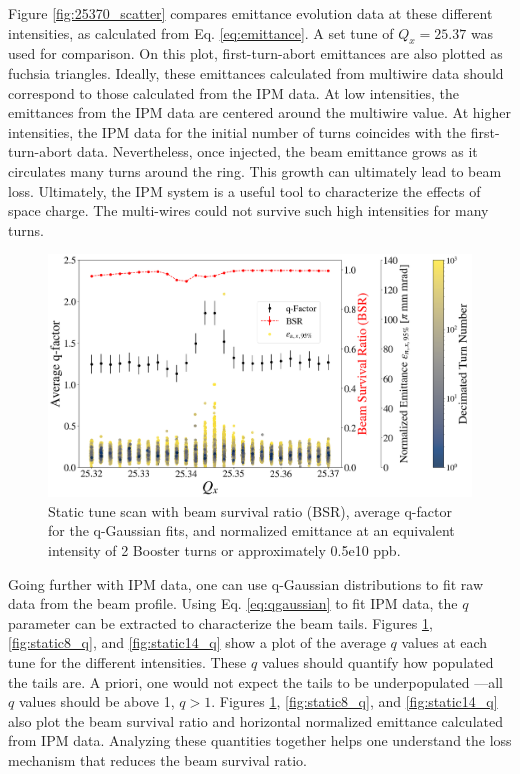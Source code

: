 Figure \ref{fig:25370_scatter} compares emittance evolution data at these different intensities, as calculated from Eq. \ref{eq:emittance}. A set tune of $Q_x=25.37$ was used for comparison. On this plot, first-turn-abort emittances are also plotted as fuchsia triangles. Ideally, these emittances calculated from multiwire data should correspond to those calculated from the IPM data. At low intensities, the emittances from the IPM data are centered around the multiwire value. At higher intensities, the IPM data for the initial number of turns coincides with the first-turn-abort data. Nevertheless, once injected, the beam emittance grows as it circulates many turns around the ring. This growth can ultimately lead to beam loss. Ultimately, the IPM system is a useful tool to characterize the effects of space charge. The multi-wires could not survive such high intensities for many turns. 

\begin{figure}[H]
    \centering
    \includegraphics[width=\columnwidth]{chapter6/static2turns_emittance_dampersOFF.png}
    \caption{Static tune scan with beam survival ratio (BSR), average q-factor for the q-Gaussian fits, and normalized emittance at an equivalent intensity of 2 Booster turns or approximately 0.5e10 ppb.}
    \label{fig:static2_q}
   \vspace{-1.25em}
\end{figure}

Going further with IPM data, one can use q-Gaussian distributions to fit raw data from the beam profile. Using Eq. \ref{eq:qgaussian} to fit IPM data, the $q$ parameter can be extracted to characterize the beam tails. Figures \ref{fig:static2_q}, \ref{fig:static8_q}, and \ref{fig:static14_q} show a plot of the average $q$ values at each tune for the different intensities. These $q$ values should quantify how populated the tails are. A priori, one would not expect the tails to be underpopulated ---all $q$ values should be above 1, $q>1$. Figures \ref{fig:static2_q}, \ref{fig:static8_q}, and \ref{fig:static14_q} also plot the beam survival ratio and horizontal normalized emittance calculated from IPM data. Analyzing these quantities together helps one understand the loss mechanism that reduces the beam survival ratio. 

